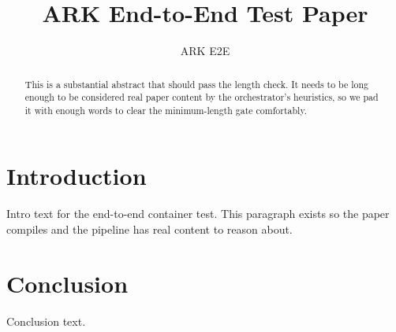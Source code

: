 \documentclass[10pt]{article}
\title{ARK End-to-End Test Paper}
\author{ARK E2E}
\begin{document}
\maketitle
\begin{abstract}
This is a substantial abstract that should pass the length check. It needs to be
long enough to be considered real paper content by the orchestrator's heuristics,
so we pad it with enough words to clear the minimum-length gate comfortably.
\end{abstract}
\section{Introduction}
Intro text for the end-to-end container test. This paragraph exists so the paper
compiles and the pipeline has real content to reason about.
\section{Conclusion}
Conclusion text.


\end{document}
